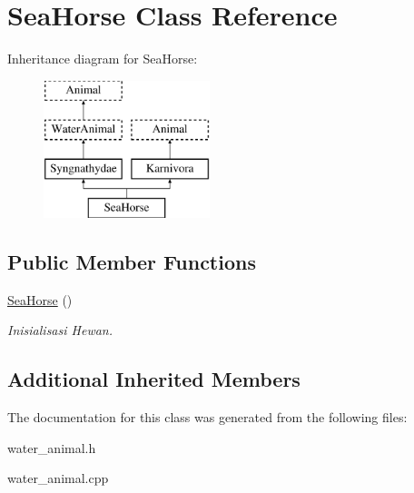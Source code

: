 \hypertarget{class_sea_horse}{}\section{Sea\+Horse Class Reference}
\label{class_sea_horse}
Inheritance diagram for Sea\+Horse\+:\begin{figure}[H]
\begin{center}
\leavevmode
\includegraphics[height=4.000000cm]{class_sea_horse}
\end{center}
\end{figure}
\subsection*{Public Member Functions}
\begin{DoxyCompactItemize}
\item 
\hyperlink{class_sea_horse_a11997e7c355c9e99a0ec09cfa8bfbbce}{Sea\+Horse} ()\hypertarget{class_sea_horse_a11997e7c355c9e99a0ec09cfa8bfbbce}{}\label{class_sea_horse_a11997e7c355c9e99a0ec09cfa8bfbbce}

\begin{DoxyCompactList}\small\item\em Inisialisasi Hewan. \end{DoxyCompactList}\end{DoxyCompactItemize}
\subsection*{Additional Inherited Members}


The documentation for this class was generated from the following files\+:\begin{DoxyCompactItemize}
\item 
water\+\_\+animal.\+h\item 
water\+\_\+animal.\+cpp\end{DoxyCompactItemize}
